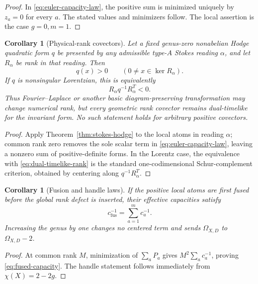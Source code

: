 \documentclass[11pt,a4paper]{amsart}
\theoremstyle{plain}
\newtheorem{corollary}[theorem]{Corollary}
\theoremstyle{definition}
\begin{document}
\begin{proof}
In \eqref{eq:euler-capacity-law}, the positive sum is minimized uniquely by $z_a=0$ for every $a$.
The stated values and minimizers follow.  The local assertion is the case $g=0,m=1$.
\end{proof}

\begin{corollary}[Physical-rank covectors]\label{cor:physical-rank}
Let a fixed genus-zero nonabelian Hodge quadratic form $q$ be presented by any admissible
type-$A$ Stokes reading $\alpha$, and let $R_\alpha$ be rank in that reading.  Then
\begin{equation}\label{eq:rank-kernel-positive}
                  q(x)>0\qquad(0\ne x\in\ker R_\alpha).
\end{equation}
If $q$ is nonsingular Lorentzian, this is equivalently
\begin{equation}\label{eq:dual-timelike-rank}
                         R_\alpha q^{-1}R_\alpha^T<0.
\end{equation}
Thus Fourier--Laplace or another basic diagram-preserving transformation may change numerical
rank, but every geometric rank covector remains dual-timelike for the invariant form.  No such
statement holds for arbitrary positive covectors.
\end{corollary}

\begin{proof}
Apply Theorem~\ref{thm:stokes-hodge} to the local atoms in reading $\alpha$; common rank zero removes
the sole scalar term in \eqref{eq:euler-capacity-law}, leaving a nonzero sum of positive-definite
forms.  In the Lorentz case, the equivalence with \eqref{eq:dual-timelike-rank} is the standard
one-codimensional Schur-complement criterion, obtained by centering along $q^{-1}R_\alpha^T$.
\end{proof}

\begin{corollary}[Fusion and handle laws]\label{cor:fusion-handles}
If the positive local atoms are first fused before the global rank defect is inserted, their
effective capacities satisfy
\begin{equation}\label{eq:fused-capacity}
                         c_{\mathrm{fus}}^{-1}=\sum_{a=1}^m c_a^{-1}.
\end{equation}
Increasing the genus by one changes no centered term and sends
$\Omega_{X,D}$ to $\Omega_{X,D}-2$.
\end{corollary}

\begin{proof}
At common rank $M$, minimization of $\sum_aP_a$ gives
$M^2\sum_ac_a^{-1}$, proving \eqref{eq:fused-capacity}.  The handle statement follows immediately
from $\chi(X)=2-2g$.
\end{proof}
\end{document}
